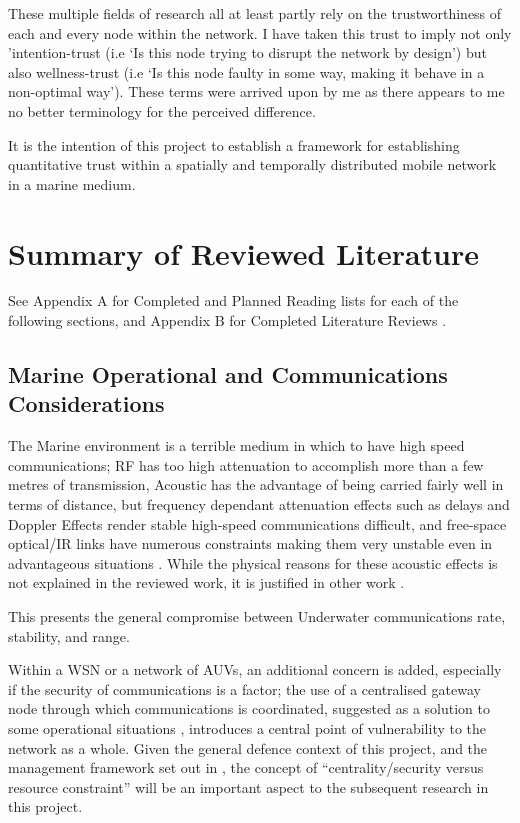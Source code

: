 \documentclass[twoside,10pt,a4paper]{Latex/Classes/PhDthesisPSnPDF}
\begin{document}
These multiple fields of research all at least partly rely on the
trustworthiness of each and every node within the network. I have taken this 
trust to imply not only 'intention-trust (i.e `Is this node trying to disrupt
the network by design') but also wellness-trust (i.e `Is this node faulty
in some way, making it behave in a non-optimal way'). These terms were arrived 
upon by me as there appears to me no better terminology for the perceived 
difference.

It is the intention of this project to establish a framework for establishing
quantitative trust within a spatially and temporally distributed mobile network
in a marine medium.

\chapter{Summary of Reviewed Literature}

See Appendix A for Completed and Planned Reading lists for each of the 
following sections, and Appendix B for Completed Literature Reviews .

\section{Marine Operational and Communications Considerations}

The Marine environment is a terrible medium in which to have high speed
communications; RF has too high attenuation to accomplish more than a few metres
of transmission, Acoustic has the advantage of being carried fairly well in
terms of distance, but frequency dependant attenuation effects such as delays
and Doppler Effects render stable high-speed communications difficult, and
free-space optical/IR links have numerous constraints making them very unstable
even in advantageous situations \cite{Partan2006} \cite{Chen}
 \cite{Akyildiz2005}. While the physical reasons for these acoustic effects is
not explained in the reviewed work, it is justified in other work
 \cite{Catipovic1990}.

This presents the general compromise between Underwater communications rate,
stability, and range.

Within a WSN or a network of AUVs, an additional concern is added, especially if
the security of communications is a factor; the use of a centralised gateway
node through which communications is coordinated, suggested as a solution to
some operational situations \cite{Partan2006} \cite{Caiti}, introduces a central
point of vulnerability to the network as a whole. Given the general defence
context of this project, and the management framework set out in
 \cite{Banks2010}, the concept of ``centrality/security versus resource
constraint'' will be an important aspect to the subsequent research in this
project.
\end{document}
